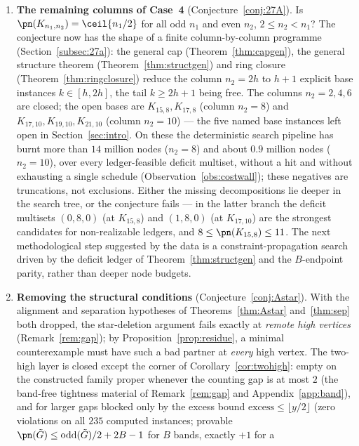 \begin{enumerate}[label=\textbf{O\arabic*.},leftmargin=2.4em]
\item \textbf{The remaining columns of Case~4} (Conjecture~\ref{conj:27A}). Is
$\pn(K_{n_1,n_2})=\ceil{n_1/2}$ for all odd $n_1$ and even $n_2$, $2\le n_2<n_1$? The
conjecture now has the shape of a finite column-by-column programme
(Section~\ref{subsec:27a}): the general cap (Theorem~\ref{thm:capgen}), the general structure
theorem (Theorem~\ref{thm:structgen}) and ring closure (Theorem~\ref{thm:ringclosure}) reduce
the column $n_2=2h$ to $h+1$ explicit base instances $k\in[h,2h]$, the tail $k\ge2h+1$ being
free. The columns $n_2=2,4,6$ are closed; the open bases are $K_{15,8},K_{17,8}$ (column
$n_2=8$) and $K_{17,10},K_{19,10},K_{21,10}$ (column $n_2=10$) --- the five named base
instances left open in Section~\ref{sec:intro}. On these the deterministic search pipeline has
burnt more than $14$ million nodes ($n_2=8$) and about $0.9$ million nodes ($n_2=10$), over
every ledger-feasible deficit multiset, without a hit and without exhausting a single schedule
(Observation~\ref{obs:costwall}); these negatives are truncations, not exclusions. Either the
missing decompositions lie deeper in the search tree, or the conjecture fails --- in the
latter branch the deficit multisets $(0,8,0)$ (at $K_{15,8}$) and $(1,8,0)$ (at $K_{17,10}$)
are the strongest candidates for non-realizable ledgers, and
$8\le\pn(K_{15,8})\le11$. The next methodological step suggested by the data is a
constraint-propagation search driven by the deficit ledger of Theorem~\ref{thm:structgen} and
the $B$-endpoint parity, rather than deeper node budgets.
\item \textbf{Removing the structural conditions} (Conjecture~\ref{conj:Astar}). With the
alignment and separation hypotheses of Theorems~\ref{thm:Astar} and~\ref{thm:sep} both
dropped, the star-deletion argument fails exactly at \emph{remote high vertices}
(Remark~\ref{rem:gap}); by Proposition~\ref{prop:residue}, a minimal counterexample must have
such a bad partner at \emph{every} high vertex. The two-high layer is closed except the corner
of Corollary~\ref{cor:twohigh}: empty on the constructed family proper whenever the counting
gap is at most $2$ (the band-free tightness material of Remark~\ref{rem:gap} and
Appendix~\ref{app:band}), and for larger gaps blocked only by the excess bound
$\mathrm{excess}\le\lfloor y/2\rfloor$ (zero violations on all $235$ computed instances;
provable $\pn(\tilde G)\le\mathrm{odd}(\tilde G)/2+2B-1$ for $B$ bands, exactly $+1$ for a

\end{enumerate}
